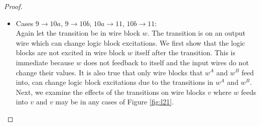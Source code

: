 \documentclass[12pt]{report}
\begin{document}
\begin{proof}
\begin{itemize}
\item
Cases $9\rightarrow10a$, $9\rightarrow10b$, $10a\rightarrow11$, $10b\rightarrow11$:  \\
Again let the transition be in wire block $w$.  The transition is on an output wire which can change logic block excitations.  We first show that the logic blocks are not excited in wire block $w$ itself after the transition.  This is immediate because $w$ does not feedback to itself and the input wires do not change their values.  It is also true that only wire blocks that $w^A$ and $w^B$ feed into, can change logic block excitations due to the transitions in $w^A$ and $w^B$.  
Next, we examine the effects of the transitions on wire blocks $v$ where $w$ feeds into $v$ and $v$ may be in any cases of Figure \ref{fig:l21}.  
\begin{itemize}

\end{itemize}
\end{itemize}
\end{proof}
\end{document}
